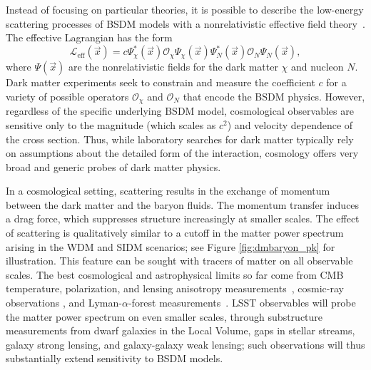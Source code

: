 Instead of focusing on particular theories, it is possible to describe the low-energy scattering processes of BSDM models with a nonrelativistic effective field theory~\citep{Fan:2010gt,Fitzpatrick:2012ix,Anand:2013yka}.
The effective Lagrangian has the form
\begin{equation}
    \mathcal{L}_\textrm{eff}(\vec{x})
    = c \Psi_\chi^\ast (\vec{x}) \mathcal{O}_\chi \Psi_\chi (\vec{x})
    \Psi_N^\ast (\vec{x}) \mathcal{O}_N \Psi_N (\vec{x}) ,
\end{equation}
where $\Psi (\vec{x})$ are the nonrelativistic fields for the dark matter $\chi$ and nucleon $N$.
Dark matter experiments seek to constrain and measure the coefficient $c$ for a variety of possible operators $\mathcal{O}_\chi$ and $\mathcal{O}_N$ that encode the BSDM physics.
However, regardless of the specific underlying BSDM model, cosmological observables are sensitive only to the magnitude (which scales as $c^2$) and velocity dependence of the cross section.
Thus, while laboratory searches for dark matter typically rely on assumptions about the detailed form of the interaction, cosmology offers very broad and generic probes of dark matter physics.

In a cosmological setting, scattering results in the exchange of momentum between the dark matter and the baryon fluids.
The momentum transfer induces a drag force, which suppresses structure increasingly at smaller scales. 
The effect of scattering is qualitatively similar to a cutoff in the matter power spectrum arising in the WDM and SIDM scenarios; see Figure \ref{fig:dmbaryon_pk} for illustration.
This feature can be sought with tracers of matter on all observable scales. 
The best cosmological and astrophysical limits so far come from CMB temperature, polarization, and lensing anisotropy measurements~\citep{Xu:2018efh,Boddy:2018kfv,Gluscevic:2017ywp,Boddy:2018wzy,Slatyer:2018aqg}, cosmic-ray observations \citep{Cappiello:2018hsu}, and Lyman-$\alpha$-forest measurements~\citep{Dvorkin:2013cea,Xu:2018efh}. 
LSST observables will probe the matter power spectrum on even smaller scales, through substructure measurements from dwarf galaxies in the Local Volume, gaps in stellar streams, galaxy strong lensing,  and galaxy-galaxy weak lensing; such observations will thus substantially extend sensitivity to BSDM models.  

